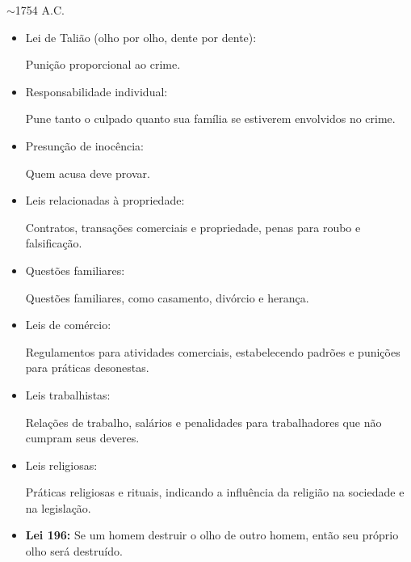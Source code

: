 \begin{multicols}{2}
	\vfill
\columnbreak

{\Large $\sim$1754 A.C.}

{\large

\begin{itemize}
	\item Lei de Talião (olho por olho, dente por dente):

{\normalsize \subitem Punição proporcional ao crime.}

\item Responsabilidade individual:

{\normalsize \subitem Pune tanto o culpado quanto sua família se estiverem envolvidos no crime.}

\item Presunção de inocência:

{\normalsize \subitem Quem acusa deve provar.}

\item Leis relacionadas à propriedade:

{\normalsize \subitem Contratos, transações comerciais e propriedade, penas para roubo e falsificação.}

\item Questões familiares:

{\normalsize \subitem Questões familiares, como casamento, divórcio e herança.}

\item Leis de comércio:

{\normalsize \subitem Regulamentos para atividades comerciais, estabelecendo padrões e punições para práticas desonestas.}

\item Leis trabalhistas:

{\normalsize \subitem Relações de trabalho, salários e penalidades para trabalhadores que não cumpram seus deveres.}

\item Leis religiosas:

{\normalsize \subitem Práticas religiosas e rituais, indicando a influência da religião na sociedade e na legislação.}

\end{itemize}}

\vfill
\columnbreak

\large

\begin{itemize}
	
	\item \textbf{Lei 196:}
		\subitem Se um homem destruir o olho de outro homem, então seu próprio olho será destruído.
	

\end{itemize}
\end{multicols}
